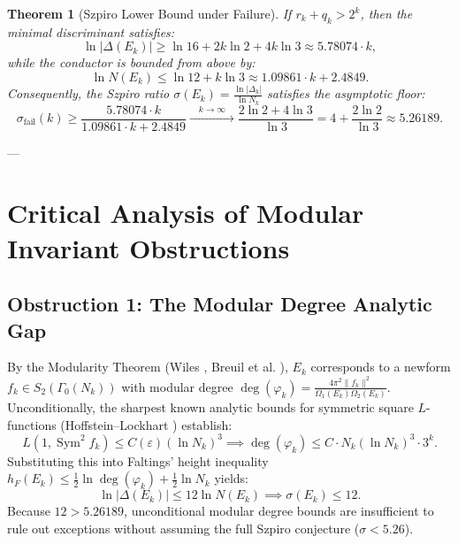 \documentclass[11pt,reqno]{amsart}
\newtheorem{theorem}{Theorem}[section]
\theoremstyle{definition}
\numberwithin{equation}{section}
\begin{document}
\begin{theorem}[Szpiro Lower Bound under Failure]\label{thm:szpiro_failure}
If $r_k + q_k > 2^k$, then the minimal discriminant satisfies:
\begin{equation}
\ln |\Delta(E_k)| \ge \ln 16 + 2k \ln 2 + 4k \ln 3 \approx 5.78074 \cdot k,
\end{equation}
while the conductor is bounded from above by:
\begin{equation}
\ln N(E_k) \le \ln 12 + k \ln 3 \approx 1.09861 \cdot k + 2.4849.
\end{equation}
Consequently, the Szpiro ratio $\sigma(E_k) = \frac{\ln |\Delta_k|}{\ln N_k}$ satisfies the asymptotic floor:
\begin{equation}
\sigma_{\mathrm{fail}}(k) \ge \frac{5.78074 \cdot k}{1.09861 \cdot k + 2.4849} \xrightarrow{\quad k \to \infty \quad} \frac{2 \ln 2 + 4 \ln 3}{\ln 3} = 4 + \frac{2 \ln 2}{\ln 3} \approx \mathbf{5.26189}.
\end{equation}
\end{theorem}

---

\section{Critical Analysis of Modular Invariant Obstructions}

\subsection{Obstruction 1: The Modular Degree Analytic Gap}
By the Modularity Theorem (Wiles \cite{wiles1995}, Breuil et al. \cite{bcdt2001}), $E_k$ corresponds to a newform $f_k \in S_2(\Gamma_0(N_k))$ with modular degree $\deg(\varphi_k) = \frac{4\pi^2 \|f_k\|^2}{\Omega_1(E_k) \Omega_2(E_k)}$.
Unconditionally, the sharpest known analytic bounds for symmetric square $L$-functions (Hoffstein--Lockhart \cite{hoffsteinlockhart1994}) establish:
\begin{equation}
L(1, \operatorname{Sym}^2 f_k) \le C(\varepsilon) (\ln N_k)^3 \implies \deg(\varphi_k) \le C \cdot N_k (\ln N_k)^3 \cdot 3^k.
\end{equation}
Substituting this into Faltings' height inequality $h_F(E_k) \le \frac{1}{2}\ln \deg(\varphi_k) + \frac{1}{2}\ln N_k$ yields:
\begin{equation}
\ln |\Delta(E_k)| \le 12 \ln N(E_k) \implies \sigma(E_k) \le 12.
\end{equation}
Because $12 > 5.26189$, unconditional modular degree bounds are insufficient to rule out exceptions without assuming the full Szpiro conjecture ($\sigma < 5.26$).
\end{document}
